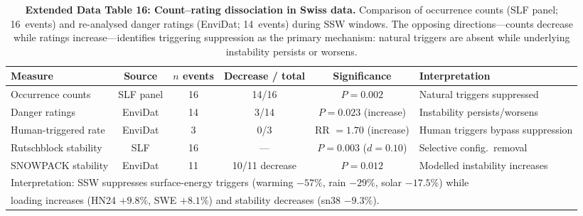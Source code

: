 \documentclass[11pt,letterpaper]{article}
\begin{document}
\begin{table}[!ht]
\centering
\caption{\textbf{Extended Data Table 16: Count--rating dissociation in Swiss data.}
Comparison of occurrence counts (SLF panel; 16~events) and re-analysed danger ratings (EnviDat; 14~events) during SSW windows. The opposing directions---counts decrease while ratings increase---identifies triggering suppression as the primary mechanism: natural triggers are absent while underlying instability persists or worsens.}
\label{tab:countrating}
\small
\begin{tabular}{lccccl}
\toprule
Measure & Source & $n$ events & Decrease / total & Significance & Interpretation \\
\midrule
Occurrence counts & SLF panel & 16 & 14/16 & $P = 0.002$ & Natural triggers suppressed \\
Danger ratings & EnviDat & 14 & 3/14 & $P = 0.023$ (increase) & Instability persists/worsens \\
Human-triggered rate & EnviDat & 3 & 0/3 & RR $= 1.70$ (increase) & Human triggers bypass suppression \\
Rutschblock stability & SLF & 16 & --- & $P = 0.003$ ($d = 0.10$) & Selective config.\ removal \\
SNOWPACK stability & EnviDat & 11 & 10/11 decrease & $P = 0.012$ & Modelled instability increases \\
\midrule
\multicolumn{6}{l}{Interpretation: SSW suppresses surface-energy triggers (warming $-57\%$, rain $-29\%$, solar $-17.5\%$) while} \\
\multicolumn{6}{l}{loading increases (HN24 $+9.8\%$, SWE $+8.1\%$) and stability decreases (sn38 $-9.3\%$).} \\
\bottomrule
\end{tabular}
\end{table}
\end{document}
